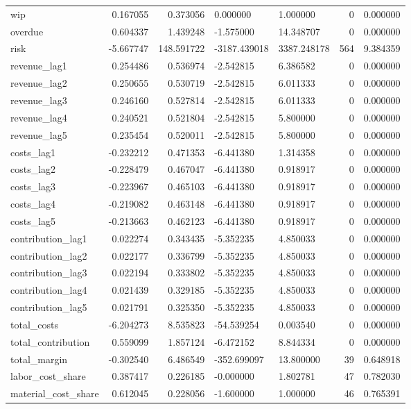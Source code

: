 \begin{landscape}
\begin{longtable}[h!]{lrrllrr}
wip & 0.167055 & 0.373056 & 0.000000 & 1.000000 & 0 & 0.000000 \\
overdue & 0.604337 & 1.439248 & -1.575000 & 14.348707 & 0 & 0.000000 \\
risk & -5.667747 & 148.591722 & -3187.439018 & 3387.248178 & 564 & 9.384359 \\
revenue_lag1 & 0.254486 & 0.536974 & -2.542815 & 6.386582 & 0 & 0.000000 \\
revenue_lag2 & 0.250655 & 0.530719 & -2.542815 & 6.011333 & 0 & 0.000000 \\
revenue_lag3 & 0.246160 & 0.527814 & -2.542815 & 6.011333 & 0 & 0.000000 \\
revenue_lag4 & 0.240521 & 0.521804 & -2.542815 & 5.800000 & 0 & 0.000000 \\
revenue_lag5 & 0.235454 & 0.520011 & -2.542815 & 5.800000 & 0 & 0.000000 \\
costs_lag1 & -0.232212 & 0.471353 & -6.441380 & 1.314358 & 0 & 0.000000 \\
costs_lag2 & -0.228479 & 0.467047 & -6.441380 & 0.918917 & 0 & 0.000000 \\
costs_lag3 & -0.223967 & 0.465103 & -6.441380 & 0.918917 & 0 & 0.000000 \\
costs_lag4 & -0.219082 & 0.463148 & -6.441380 & 0.918917 & 0 & 0.000000 \\
costs_lag5 & -0.213663 & 0.462123 & -6.441380 & 0.918917 & 0 & 0.000000 \\
contribution_lag1 & 0.022274 & 0.343435 & -5.352235 & 4.850033 & 0 & 0.000000 \\
contribution_lag2 & 0.022177 & 0.336799 & -5.352235 & 4.850033 & 0 & 0.000000 \\
contribution_lag3 & 0.022194 & 0.333802 & -5.352235 & 4.850033 & 0 & 0.000000 \\
contribution_lag4 & 0.021439 & 0.329185 & -5.352235 & 4.850033 & 0 & 0.000000 \\
contribution_lag5 & 0.021791 & 0.325350 & -5.352235 & 4.850033 & 0 & 0.000000 \\
total_costs & -6.204273 & 8.535823 & -54.539254 & 0.003540 & 0 & 0.000000 \\
total_contribution & 0.559099 & 1.857124 & -6.472152 & 8.844334 & 0 & 0.000000 \\
total_margin & -0.302540 & 6.486549 & -352.699097 & 13.800000 & 39 & 0.648918 \\
labor_cost_share & 0.387417 & 0.226185 & -0.000000 & 1.802781 & 47 & 0.782030 \\
material_cost_share & 0.612045 & 0.228056 & -1.600000 & 1.000000 & 46 & 0.765391 \\

\end{longtable}
\end{landscape}

